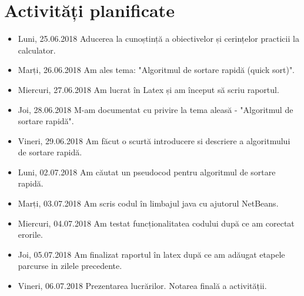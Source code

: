 \documentclass{report}
\begin{document}
\chapter{Activități planificate}
\begin{itemize}
\item  Luni, 25.06.2018 \newline
Aducerea la cunoștință a obiectivelor și cerințelor practicii la calculator.
\item  Marți, 26.06.2018 \newline
Am ales tema: "Algoritmul de sortare rapidă (quick sort)".
\item  Miercuri, 27.06.2018 \newline
Am lucrat în Latex și am început să scriu raportul.
\item  Joi, 28.06.2018 \newline
M-am documentat cu privire la tema aleasă - "Algoritmul de sortare rapidă".
\item  Vineri, 29.06.2018  \newline
Am făcut o scurtă introducere si descriere a algoritmului de sortare rapidă.
\item  Luni, 02.07.2018  \newline
Am căutat un pseudocod pentru algoritmul de sortare rapidă.
\item  Marți, 03.07.2018  \newline
Am scris codul în limbajul java cu ajutorul NetBeans.
\item  Miercuri, 04.07.2018  \newline
Am testat funcționalitatea codului după ce am corectat erorile.  
\item  Joi, 05.07.2018  \newline
Am finalizat raportul în latex după ce am adăugat etapele parcurse in zilele precedente.
\item  Vineri, 06.07.2018  \newline
Prezentarea lucrărilor.
Notarea finală a activității.
\end{itemize}
\end{document}
